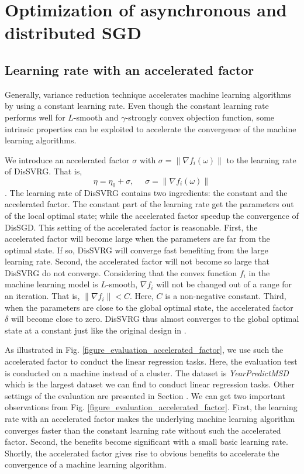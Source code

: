 \documentclass[10pt,journal,finalsubmission,compsoc]{IEEEtran}
\begin{document}
\section{Optimization of asynchronous and distributed SGD}
\label{optimization_sgd}
\subsection{Learning rate with an accelerated factor}
Generally, variance reduction technique accelerates machine learning algorithms by using a constant learning rate. Even though the constant learning rate performs well for $L$-smooth and $\gamma$-strongly convex objection function, some intrinsic properties can be exploited to accelerate the convergence of the machine learning algorithms. 

We introduce an accelerated factor $\sigma$ with $\sigma=\parallel \nabla f_i(\omega)\parallel$ to the learning rate of DisSVRG. That is,
\begin{equation}
\eta=\eta_0+\sigma,~~~~~~\sigma=\parallel \nabla f_i(\omega)\parallel
\end{equation}.
The learning rate of DisSVRG contains two ingredients: the constant and the accelerated factor. The constant part of the learning rate get the parameters out of the local optimal state; while the accelerated factor speedup the convergence of DisSGD. This setting of the accelerated factor is reasonable. First, the accelerated factor will become large when the parameters are far from the optimal state. If so, DisSVRG will converge fast benefiting from the large learning rate. Second, the accelerated factor will not become so large that DisSVRG do not converge. Considering that the convex function $f_i$ in the machine learning model is $L$-smooth, $\nabla f_i$ will not be changed out of  a range for an iteration. That is, $\parallel\nabla f_i\parallel<C$. Here, $C$ is a non-negative constant. Third, when the parameters are close to the global optimal state, the accelerated factor $\delta$ will become close to zero. DisSVRG thus almost converges to the global optimal state at a constant just like the original design in \cite{Johnson:9MAvkbgy}.

As illustrated in Fig. \ref{figure_evaluation_accelerated_factor}, we use such the accelerated factor to conduct the linear regression tasks. Here, the evaluation test is conducted on a machine instead of a cluster. The dataset is \emph{YearPredictMSD} which is the largest dataset we can find to conduct linear regression tasks. Other settings of the evaluation are presented in Section \label{performance_evaluation}.  We can get two important observations from Fig. \ref{figure_evaluation_accelerated_factor}. First, the learning rate with an accelerated factor makes the underlying machine learning algorithm converges faster than the constant learning rate without such the accelerated factor. Second, the benefits become significant with a small basic learning rate. Shortly,  the accelerated factor gives rise to obvious benefits to accelerate the convergence of a machine learning algorithm.
\end{document}
